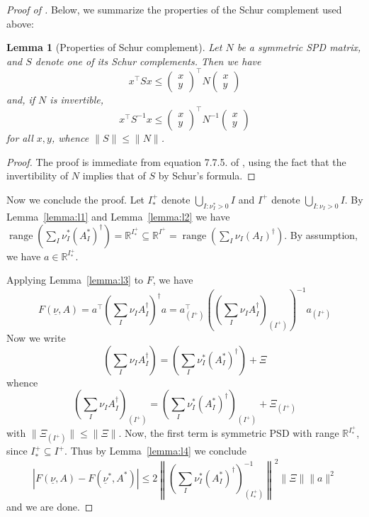 \documentclass{article} %
\newcommand{\R}{\mathbb{R}}
\DeclareMathOperator{\range}{range}
\newtheorem{lemma}[lemma]{Lemma}
\newcommand{\ul}[1]{\underline{#1}}
\begin{document}
\begin{proof}[Proof of ]
Below, we summarize the properties of the Schur complement used above:

\begin{lemma}[Properties of Schur complement]\label{lemma:schur}
Let $N$ be a symmetric SPD matrix, and $S$ denote one of its Schur complements. Then we have
\[
x^\top S x \leq \begin{pmatrix}
    x \\
    y
\end{pmatrix}^\top N\begin{pmatrix}
    x \\ y
\end{pmatrix}
\]
and, if $N$ is invertible,
\[
x^\top S^{-1} x \leq \begin{pmatrix}
    x \\
    y
\end{pmatrix}^\top N^{-1}\begin{pmatrix}
    x \\ y
\end{pmatrix}
\]
for all $x,y$, whence $\|S\|\leq \|N\|$.
\end{lemma}
\begin{proof}
    The proof is immediate from equation 7.7.5. of \citet{horn2012matrix}, using the fact that the invertibility of $N$ implies that of $S$ by Schur's formula.
\end{proof}

Now we conclude the proof. Let $I^+_*$ denote $\bigcup_{I:\nu_I^*>0} I$ and $I^+$ denote $\bigcup_{I:\nu_I>0}I$. By Lemma~\ref{lemma:l1} and Lemma~\ref{lemma:l2} we have $\range(\sum_I\nu_I^*(A^*_I)^\dagger)=\R^{I^+_*} \subseteq \R^{I^+}=\range(\sum_I\nu_I(A_I)^\dagger)$. By assumption, we have $a\in \R^{I^+_*}$.

Applying Lemma~\ref{lemma:l3} to $F$, we have
\[
F(\ul{\nu},A) = a^\top\left(\sum_I\nu_I A_I^\dagger\right)^\dagger a = a_{(I^+)}^\top\left(\left(\sum_I\nu_I A_I^\dagger\right)_{(I^+)}\right)^{-1} a_{(I^+)}
\]
Now we write
\[
\left(\sum_I\nu_I A_I^\dagger\right) = \left(\sum_I\nu_I^* (A_I^*)^\dagger\right) + \Xi
\]
whence
\[
\left(\sum_I\nu_I A_I^\dagger\right)_{(I^+)} = \left(\sum_I\nu_I^* (A_I^*)^\dagger\right)_{(I^+)} + \Xi_{(I^+)}
\]
with $\|\Xi_{(I^+)}\|\leq\|\Xi\|$. Now, the first term is symmetric PSD with range $\R^{I^+_*}$, since $I^+_*\subseteq I^+$. Thus by Lemma~\ref{lemma:l4} we conclude
\[
|F(\ul{\nu},A)-F(\ul{\nu}^*,A^*)|\leq 2\left\|\left(\sum_I \nu^*_I(A_I^*)^\dagger\right)_{(I^+_*)}^{-1}\right\|^2\|\Xi\|\|a\|^2
\]
and we are done.
\end{proof}
\end{document}
